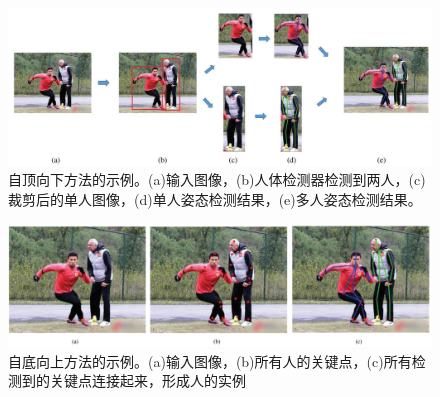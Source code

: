 \documentclass[hyperref]{ctexart}
\begin{document}
\begin{figure}[H]
\centering
\includegraphics[scale = 0.33]{10}
\caption{自顶向下方法的示例。(a)输入图像，(b)人体检测器检测到两人，(c)裁剪后的单人图像，(d)单人姿态检测结果，(e)多人姿态检测结果。}
\label{i}
\end{figure}
\begin{figure}[H]
	\centering
	\includegraphics[scale = 0.36]{11}
	\caption{自底向上方法的示例。(a)输入图像，(b)所有人的关键点，(c)所有检测到的关键点连接起来，形成人的实例}
	\label{j}
\end{figure}
\end{document}
